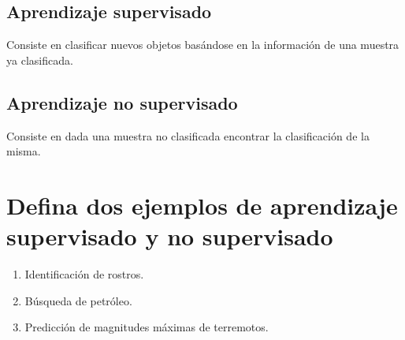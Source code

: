 \documentclass[stu, 12pt, letterpaper, donotrepeattitle, floatsintext, natbib]{apa7}
\begin{document}
        \subsection{Aprendizaje supervisado}
            Consiste en clasificar nuevos objetos basándose en la información de una muestra ya clasificada.

        \subsection{Aprendizaje no supervisado}
            Consiste en dada una muestra no clasificada encontrar la clasificación de la misma.

    \section{Defina dos ejemplos de aprendizaje supervisado y no supervisado}
        \begin{enumerate}
            \item Identificación de rostros.
            \item Búsqueda de petróleo.
            \item Predicción de magnitudes máximas de terremotos.
        \end{enumerate}
    
\end{document}
